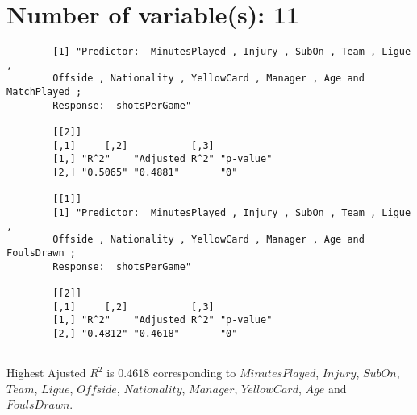 \documentclass[12pt]{article}
\begin{document}
	\section{Number of variable(s): 11}
	\begin{verbatim}
		[1] "Predictor:  MinutesPlayed , Injury , SubOn , Team , Ligue , 
		Offside , Nationality , YellowCard , Manager , Age and MatchPlayed ; 
		Response:  shotsPerGame"
		
		[[2]]
		[,1]     [,2]           [,3]     
		[1,] "R^2"    "Adjusted R^2" "p-value"
		[2,] "0.5065" "0.4881"       "0"      
		
		[[1]]
		[1] "Predictor:  MinutesPlayed , Injury , SubOn , Team , Ligue , 
		Offside , Nationality , YellowCard , Manager , Age and FoulsDrawn ; 
		Response:  shotsPerGame"
		
		[[2]]
		[,1]     [,2]           [,3]     
		[1,] "R^2"    "Adjusted R^2" "p-value"
		[2,] "0.4812" "0.4618"       "0"      
		
	\end{verbatim}
	Highest Ajusted $ R^2 $ is 0.4618 corresponding to $ MinutesPlayed $, $ Injury $, $ SubOn $, $ Team $, $ Ligue $, $ Offside $, $ Nationality $, $ Manager $, $ YellowCard $, $ Age $ and $ FoulsDrawn $.
	
	
\end{document}

